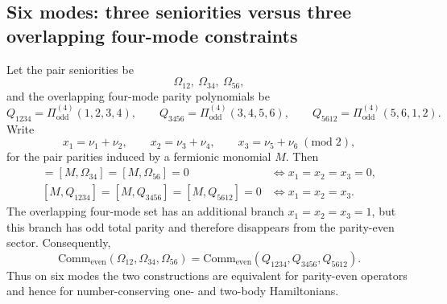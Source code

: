 \documentclass[11pt]{article}
\newcommand{\odd}{\mathrm{odd}}
\newcommand{\even}{\mathrm{even}}
\newcommand{\Comm}{\mathrm{Comm}}
\newcommand{\modtwo}{\; (\mathrm{mod}\; 2)}
\theoremstyle{definition}
\theoremstyle{remark}
\begin{document}
\subsection{Six modes: three seniorities versus three overlapping four-mode constraints}
Let the pair seniorities be
\begin{equation}
  \Omega_{12},\ \Omega_{34},\ \Omega_{56},
\end{equation}
and the overlapping four-mode parity polynomials be
\begin{equation}
  Q_{1234}=\Pi^{(4)}_{\odd}(1,2,3,4),
  \qquad
  Q_{3456}=\Pi^{(4)}_{\odd}(3,4,5,6),
  \qquad
  Q_{5612}=\Pi^{(4)}_{\odd}(5,6,1,2).
\end{equation}
Write
\begin{equation}
  x_1=\nu_1+\nu_2,
  \qquad
  x_2=\nu_3+\nu_4,
  \qquad
  x_3=\nu_5+\nu_6 \modtwo,
\end{equation}
for the pair parities induced by a fermionic monomial $M$. Then
\begin{align}
  [M,\Omega_{12}]=[M,\Omega_{34}]=[M,\Omega_{56}]=0
  &\iff x_1=x_2=x_3=0,
  \\
  [M,Q_{1234}]=[M,Q_{3456}]=[M,Q_{5612}]=0
  &\iff x_1=x_2=x_3.
\end{align}
The overlapping four-mode set has an additional branch $x_1=x_2=x_3=1$, but this branch has odd total parity and therefore disappears from the parity-even sector. Consequently,
\begin{equation}
  \Comm_{\even}(\Omega_{12},\Omega_{34},\Omega_{56})
  =
  \Comm_{\even}(Q_{1234},Q_{3456},Q_{5612}).
\end{equation}
Thus on six modes the two constructions are equivalent for parity-even operators and hence for number-conserving one- and two-body Hamiltonians.
\end{document}
